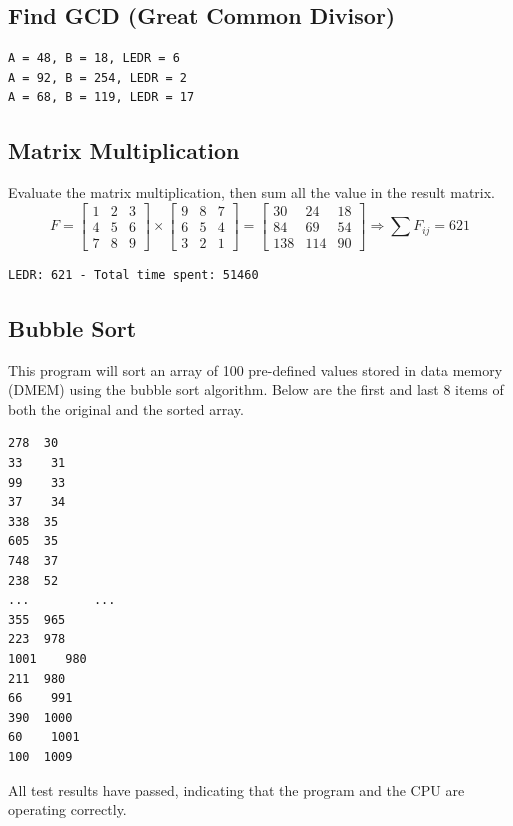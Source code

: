 \documentclass[12pt,a4paper,oneside]{book} %
\begin{document}
\subsection{Find GCD (Great Common Divisor)}

\begin{verbatim}
A = 48, B = 18, LEDR = 6
A = 92, B = 254, LEDR = 2
A = 68, B = 119, LEDR = 17
\end{verbatim}

\subsection{Matrix Multiplication}
Evaluate the matrix multiplication, then sum all the value in the result matrix.
$$F=
\left[\begin{matrix}
1 & 2 & 3\\
4 & 5 & 6\\
7 & 8 & 9
\end{matrix}\right]\times
\left[\begin{matrix}
9 & 8 & 7\\
6 & 5 & 4\\
3 & 2 & 1
\end{matrix}\right]=
\left[\begin{matrix}
30 & 24 & 18\\
84 & 69 & 54\\
138 & 114 & 90
\end{matrix}\right]\Rightarrow
\sum F_{ij} = 621
$$

\begin{verbatim}
LEDR: 621 - Total time spent: 51460
\end{verbatim}

\subsection{Bubble Sort}
This program will sort an array of 100 pre-defined values stored in data memory (DMEM) using the bubble sort algorithm. Below are the first and last 8 items of both the original and the sorted array.

\begin{verbatim}
278	 30
33	  31
99	  33
37	  34
338	 35
605	 35
748	 37
238	 52
...         ...
355	 965
223	 978
1001	980
211	 980
66	  991
390	 1000
60	  1001
100	 1009
\end{verbatim}

All test results have passed, indicating that the program and the CPU are operating correctly.
\end{document}

